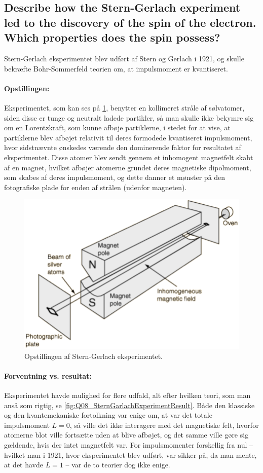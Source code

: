 \subsection{Describe how the Stern-Gerlach experiment led to the discovery of the spin of the electron. Which properties does the spin possess?}


Stern-Gerlach eksperimentet blev udført af Stern og Gerlach i 1921, og skulle bekræfte Bohr-Sommerfeld teorien om, at impulsmoment er kvantiseret.

\paragraph{Opstillingen:} Eksperimentet, som kan ses på \cref{fig:Q08_SternGerlachEksperimentOpstilling}, benytter en kollimeret stråle af sølvatomer, siden disse er tunge og neutralt ladede partikler, så man skulle ikke bekymre sig om en Lorentzkraft, som kunne afbøje partiklerne, i stedet for at vise, at partiklerne blev afbøjet relativit til deres formodede kvantiseret impulsmoment, hvor sidstnævnte ønskedes værende den dominerende faktor for resultatet af eksperimentet. Disse atomer blev sendt gennem et inhomogent magnetfelt skabt af en magnet, hvilket afbøjer atomerne grundet deres magnetiske dipolmoment, som skabes af deres impulsmoment, og dette danner et mønster på den fotografiske plade for enden af strålen (udenfor magneten).

\begin{figure}[!h]
    \centering
    \includegraphics[width = .75\textwidth]{Q08/images/SternGerlachExperiment.PNG}
    \caption{Opstillingen af Stern-Gerlach eksperimentet.}
    \label{fig:Q08_SternGerlachEksperimentOpstilling}
\end{figure}

\paragraph{Forventning vs. resultat:} Eksperimentet havde mulighed for flere udfald, alt efter hvilken teori, som man anså som rigtig, se \cref{fig:Q08_SternGarlachExperimentResult}. Både den klassiske og den kvantemekaniske fortolkning var enige om, at var det totale impulsmoment $L = 0$, så ville det ikke interagere med det magnetiske felt, hvorfor atomerne blot ville fortsætte uden at blive afbøjet, og det samme ville gøre sig gældende, hvis der intet magnetfelt var. For impulsmomenter forskellig fra nul -- hvilket man i 1921, hvor eksperimentet blev udført, var sikker på, da man mente, at det havde $L = 1$ -- var de to teorier dog ikke enige.


